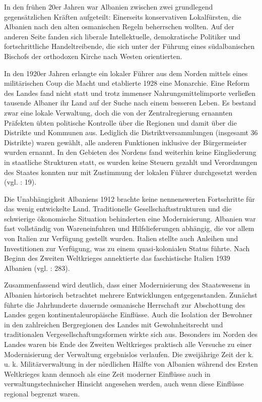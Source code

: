 In den frühen 20er Jahren war Albanien zwischen zwei grundlegend gegensätzlichen Kräften aufgeteilt: Einerseits konservativen Lokalfürsten, die Albanien nach den alten osmanischen Regeln beherrschen wollten. Auf der anderen Seite fanden sich liberale Intellektuelle, demokratische Politiker und fortschrittliche Handeltreibende, die sich unter der Führung eines südalbanischen Bischofs der orthodoxen Kirche nach Westen orientierten.\par
In den 1920er Jahren erlangte ein lokaler Führer aus dem Norden mittels eines militärischen Coup die Macht und etablierte 1928 eine Monarchie. Eine Reform des Landes fand nicht statt und trotz immenser Nahrungsmittelimporte verließen tausende Albaner ihr Land auf der Suche nach einem besseren Leben. Es bestand zwar eine lokale Verwaltung, doch die von der Zentralregierung ernannten Präfekten übten politische Kontrolle über die Regionen und damit über die Distrikte und Kommunen aus. Lediglich die Distriktversammlungen (insgesamt 36 Distrikte) waren gewählt, alle anderen Funktionen inklusive der Bürgermeister wurden ernannt. In den Gebieten des Nordens fand weiterhin keine Eingliederung in staatliche Strukturen statt, es wurden keine Steuern gezahlt und Verordnungen des Staates konnten nur mit Zustimmung der lokalen Führer durchgesetzt werden (vgl. \cite{biber} : 19).\par
Die Unabhängigkeit Albaniens 1912 brachte keine nennenswerten Fortschritte für das wenig entwickelte Land. Traditionelle Gesellschaftsstrukturen und die schwierige ökonomische Situation behinderten eine Modernisierung. Albanien war fast vollständig von Wareneinfuhren und Hilfslieferungen abhängig, die vor allem von Italien zur Verfügung gestellt wurden. Italien stellte auch Anleihen und Investitionen zur Verfügung, was zu einem quasi-kolonialen Status führte. Nach Beginn des Zweiten Weltkrieges annektierte das faschistische Italien 1939 Albanien (vgl. \cite{fisch84} : 283).
\par
Zusammenfassend wird deutlich, dass einer Modernisierung des Staatswesens in Albanien historisch betrachtet mehrere Entwicklungen entgegenstanden. Zunächst führte die Jahrhunderte dauernde osmanische Herrschaft zur Abschottung des Landes gegen kontinentaleuropäische Einflüsse. Auch die Isolation der Bewohner in den zahlreichen Bergregionen des Landes mit Gewohnheitsrecht und traditionalen Vergesellschaftungsformen wirkte sich aus. Besonders im Norden des Landes waren bis Ende des Zweiten Weltkrieges praktisch alle Versuche zu einer Modernisierung der Verwaltung ergebnislos verlaufen. Die zweijährige Zeit der k. u. k. Militärverwaltung in der nördlichen Hälfte von Albanien während des Ersten Weltkrieges kann dennoch als eine Zeit moderner Einflüsse auch in verwaltungstechnischer Hinsicht angesehen werden, auch wenn diese Einflüsse regional begrenzt waren.\par

